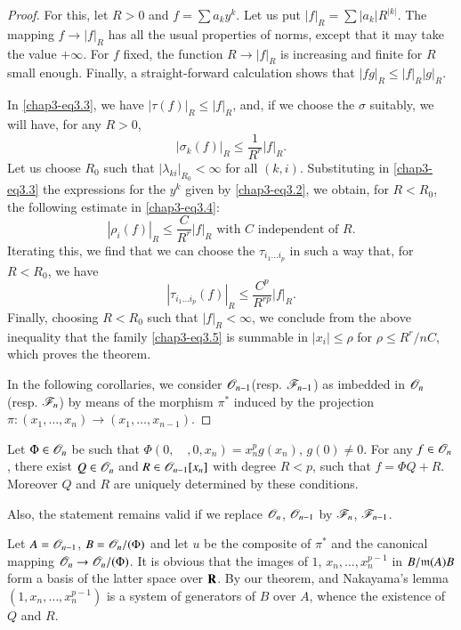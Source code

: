 \begin{proof}
For this, let $R>0$ and $f=\sum a_{k}y^{k}$. Let us put $|f|_{R}=\sum | a_{k} |R^{|k|}$. The mapping $f\to |f|_{R}$ has all the usual properties of norms, except that it may take the value $+\infty$. For $f$ fixed, the function $R\to |f|_{R}$ is increasing and finite for $R$ small enough. Finally, a straight-forward calculation shows that $|fg|_{R}\leq |f|_{R}|g|_{R}$.

In \eqref{chap3-eq3.3}, we have $|\tau (f)|_{R}\leq |f|_{R}$, and, if we choose the $\sigma$ suitably, we will have, for any $R>0$,
$$
|\sigma_{k}(f)|_{R}\leq \dfrac{1}{R^{r}}|f|_{R}.
$$
Let us choose $R_{0}$ such that $|\lambda_{ki}|_{R_{0}}<\infty$ for all $(k,i)$. Substituting in \eqref{chap3-eq3.3} the expressions for the $y^{k}$ given by \eqref{chap3-eq3.2}, we obtain, for $R<R_{0}$, the following estimate in \eqref{chap3-eq3.4}:
$$
|\rho_{i}(f)|_{R}\leq \dfrac{C}{R^{r}}|f|_{R}\text{ with $C$ independent of $R$.}
$$
Iterating this, we find that we can choose the $\tau_{i_{1}\ldots i_{p}}$ in such a way that, for $R<R_{0}$, we have
$$
|\tau_{i_{1}\ldots i_{p}}(f)|_{R}\leq \dfrac{C^{p}}{R^{rp}}|f|_{R}.
$$
Finally, choosing $R<R_{0}$ such that $|f|_{R}<\infty$, we conclude from the above inequality that the family \eqref{chap3-eq3.5} is summable in $|x_{i}|\leq \rho$ for $\rho\leq R^{r}/nC$, which proves the theorem.

In the following corollaries, we consider $\mathscr{O}_{n-1}$(resp. $\mathscr{F}_{n-1}$) as imbedded in $\mathscr{O}_{n}$ (resp. $\mathscr{F}_{n}$) by means of the morphism $\pi^{*}$ induced by the projection $\pi:(x_{1},\ldots,x_{n})\to (x_{1},\ldots,x_{n-1})$.
\end{proof}

\setcounter{theorem}{5}
\begin{corollary}\label{chap3-coro3.6}
Let $\Phi\in \mathscr{O}_{n}$ be such that $\Phi(0,\quad,0,x_{n})=x^{p}_{n}g(x_{n})$, $g(0)\neq 0$. For any $f\in \mathscr{O}_{n}$, there exist $Q\in \mathscr{O}_{n}$ and $R\in \mathscr{O}_{n-1}[x_{n}]$ with degree $R<p$, such that $f=\Phi Q+R$. Moreover $Q$ and $R$ are uniquely determined by these conditions.

Also, the statement remains valid if we replace $\mathscr{O}_{n}$, $\mathscr{O}_{n-1}$ by $\mathscr{F}_{n}$, $\mathscr{F}_{n-1}$.
\end{corollary}

Let $A=\mathscr{O}_{n-1}$, $B=\mathscr{O}_{n}/(\Phi)$ and let $u$ be the composite of $\pi^{*}$ and the canonical mapping $\mathscr{O}_{n}\to \mathscr{O}_{n}/(\Phi)$. It is obvious that the images of $1$, $x_{n},\ldots,x^{p-1}_{n}$ in $B/\mathfrak{m}(A)B$ form a basis of the latter space over $\mathbf{R}$. By our theorem, and Nakayama's lemma $(1,x_{n},\ldots,x^{p-1}_{n})$ is a system of generators of $B$ over $A$, whence the existence of $Q$ and $R$.

